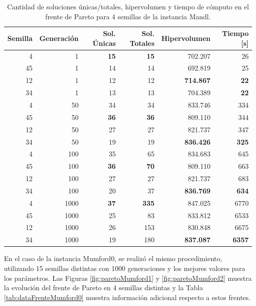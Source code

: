 \begin{table}[!htb]
\centering
\begin{tabular}{|r|r|r|r|r|r|}
\hline
Semilla & Generación & Sol. Únicas & Sol. Totales & Hipervolumen & Tiempo [s]\\ 
\hline \hline
4 & 1 & \textbf{15} & \textbf{15} & 702.207 & 26 \\ \hline
45 & 1 & 14 & 14 & 692.819 & 25 \\ \hline
12 & 1 & 12 & 12 & \textbf{714.867} & \textbf{22} \\ \hline
34 & 1 & 13 & 13 & 704.389 & \textbf{22} \\ \hline \hline
4 & 50 & 34 & 34 & 833.746 & 334 \\ \hline
45 & 50 & \textbf{36} & \textbf{36} & 809.110 & 344 \\ \hline
12 & 50 & 27 & 27 & 821.737 & 347 \\ \hline
34 & 50 & 19 & 19 & \textbf{836.426} & \textbf{325} \\ \hline\hline
4 & 100 & 35 & 65 & 834.683 & 645 \\ \hline
45 & 100 & \textbf{36} & \textbf{70} & 809.110 & 663 \\ \hline
12 & 100 & 27 & 27 & 821.737 & 683 \\ \hline
34 & 100 & 20 & 37 & \textbf{836.769} & \textbf{634} \\ \hline \hline
4 & 1000 & \textbf{37} & \textbf{335} & 847.025 & 6770 \\ \hline
45 & 1000 & 25 & 83 & 833.812 & 6533 \\ \hline
12 & 1000 & 26 & 153 & 830.848 & 6675 \\ \hline
34 & 1000 & 19 & 180 & \textbf{837.087} & \textbf{6357} \\ \hline
\end{tabular}
\caption{Cantidad de soluciones únicas/totales, hipervolumen y tiempo de cómputo en el frente de Pareto para 4 semillas de la instancia Mandl.}
\label{tab:dataFrenteMandl}
\end{table}

En el caso de la instancia Mumford0, se realizó el mismo procedimiento, utilizando 15 semillas distintas con 1000 generaciones y los mejores valores  para los parámetros. Las Figuras \ref{fig:paretoMumford1} y \ref{fig:paretoMumford2} muestra la evolución del frente de Pareto en 4 semillas distintas y la Tabla \ref{tab:dataFrenteMumford0} muestra información adicional respecto a estos frentes.

